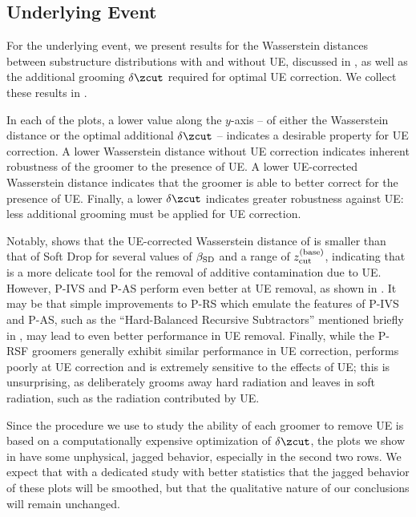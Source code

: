 \subsection{Underlying Event}
\label{app:uefrenzy}

For the underlying event, we present results for the Wasserstein distances between substructure distributions with and without UE, discussed in , as well as the additional grooming \(\delta\zcut\) required for optimal UE correction.
%
We collect these results in .

In each of the plots, a lower value along the $y$-axis -- of either the Wasserstein distance or the optimal additional \(\delta\zcut\) -- indicates a desirable property for UE correction.
%
A lower Wasserstein distance without UE correction indicates inherent robustness of the groomer to the presence of UE.
%
A lower UE-corrected Wasserstein distance indicates that the groomer is able to better correct for the presence of UE.
%
Finally, a lower \(\delta\zcut\) indicates greater robustness against UE:
%
less additional grooming must be applied for UE correction.

Notably,  shows that the UE-corrected Wasserstein distance of  is smaller than that of Soft Drop for several values of \(\beta_{\rm SD}\) and a range of \(z_{\rm cut}^{\rm (base)}\), indicating that  is a more delicate tool for the removal of additive contamination due to UE.
%
However, P-IVS and P-AS perform even better at UE removal, as shown in .
%
It may be that simple improvements to P-RS which emulate the features of P-IVS and P-AS, such as the ``Hard-Balanced Recursive Subtractors'' mentioned briefly in , may lead to even better performance in UE removal.
%
Finally, while the P-RSF groomers generally exhibit similar performance in UE correction,  performs poorly at UE correction and is extremely sensitive to the effects of UE;
%
this is unsurprising, as  deliberately grooms away hard radiation and leaves in soft radiation, such as the radiation contributed by UE.

Since the procedure we use to study the ability of each groomer to remove UE is based on a computationally expensive optimization of \(\delta\zcut\), the plots we show in  have some unphysical, jagged behavior, especially in the second two rows.
%
We expect that with a dedicated study with better statistics that the jagged behavior of these plots will be smoothed, but that the qualitative nature of our conclusions will remain unchanged.


